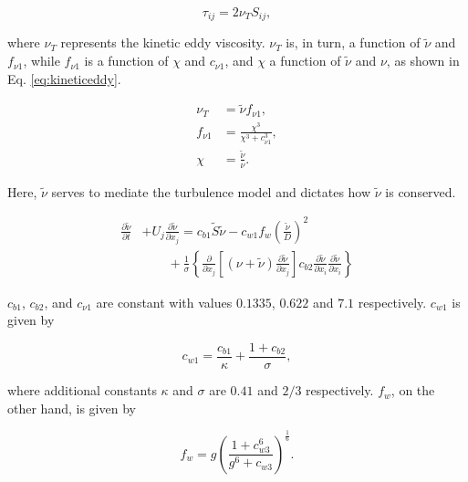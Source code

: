\documentclass[a4paper,fleqn]{cas-sc}
\begin{document}
\begin{equation}
  \tau_{ij} = 2 \nu_{T}S_{ij},
  \label{eq:tauij}
\end{equation}

\noindent where $\nu_{T}$ represents the kinetic eddy viscosity. $\nu_{T}$ is, in turn, a function of $\tilde{\nu}$ and $f_{\nu 1}$, while $f_{\nu 1}$ is a function of $\chi$ and $c_{\nu 1}$, and $\chi$ a function of $\tilde{\nu}$ and $\nu$, as shown in Eq. \ref{eq:kineticeddy}.

\begin{subequations}
  \label{eq:kineticeddy}
  \begin{align}
    \nu_{T}   & = \tilde{\nu} f_{\nu 1}, \label{eq:kineticeddyA}\\
    f_{\nu 1} & = \frac{\chi^{3}}{\chi^{3}+c^{3}_{\nu 1}}, \label{eq:kineticeddyB}\\
    \chi      & = \frac{\tilde{\nu}}{\nu}. \label{eq:kineticeddyC}
\end{align}
\end{subequations}

\noindent Here, $\tilde{\nu}$ serves to mediate the turbulence model and dictates how $\tilde{\nu}$ is conserved.

\begin{align}
  \label{eq:kineticEddyTransport}
  \frac{\partial \tilde{\nu}}{\partial t} &+ U_{j} \frac{\partial \tilde{\nu}}{\partial x_{j}} = c_{b1}\tilde{S}\tilde{\nu} - c_{w1} f_{w} \left( \frac{\tilde{\nu}}{D} \right)^{2} \nonumber \\
  &\qquad {} + \frac{1}{\sigma} \left\{ \frac{\partial}{\partial x_{j}} \left[ \left( \nu + \tilde{\nu} \right) \frac{\partial \tilde{\nu}}{\partial x_{j}} \right] c_{b2} \frac{\partial \tilde{\nu}}{\partial x_{i}} \frac{\partial \tilde{\nu}}{\partial x_{i}} \right\}
\end{align}

$c_{b1}$, $c_{b2}$, and $c_{\nu 1}$ are constant with values $0.1335$, $0.622$ and $7.1$ respectively. $c_{w1}$ is given by

\begin{equation}
  c_{w1} = \frac{c_{b1}}{\kappa} + \frac{1+c_{b2}}{\sigma},
  \label{eq:cw1}
\end{equation}

\noindent where additional constants $\kappa$ and $\sigma$ are $0.41$ and $2/3$ respectively. $f_{w}$, on the other hand, is given by

\begin{equation}
  f_{w} = g \left( \frac{1 + c^{6}_{w3}}{g^{6} + c_{w3}} \right)^{\frac{1}{6}}.
  \label{eq:fw}
\end{equation}
\end{document}
